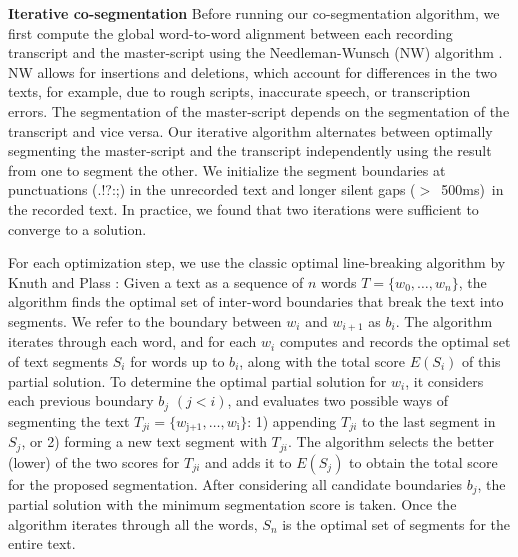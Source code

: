 \textbf{Iterative co-segmentation}
Before running our co-segmentation algorithm, we first compute the global word-to-word alignment between each recording transcript and the master-script using the Needleman-Wunsch (NW) algorithm \cite{needleman1970general}. NW allows for insertions and deletions, which account for differences in the two texts, for example, due to rough scripts, inaccurate speech, or transcription errors.
%
The segmentation of the master-script depends on the segmentation of the transcript and vice versa. Our iterative algorithm alternates between optimally segmenting the master-script and the transcript independently using the result from one to segment the other. We initialize the segment boundaries at punctuations (.!?:;) in the unrecorded text and longer silent gaps ($>$\ 500ms)\ in the recorded text. In practice, we
found that two iterations were sufficient to converge to a solution.


For each optimization step, we use the classic optimal line-breaking algorithm by Knuth and Plass \cite{knuth1981breaking}: Given a text as a sequence of $n$ words $T = \{w_0,\dots,w_n\}$, the algorithm finds the optimal set of inter-word
boundaries that break the text into segments. We refer to the boundary between $w_i$ and $w_{i+1}$ as
$b_i$.
%
The algorithm iterates through each word, and for each $w_i$
computes and records the optimal set of text segments $S_i$ for words up to $b_i$, along with the total score $E(S_i)$ of
this partial solution. To determine the optimal partial solution for $w_i$, it
considers each previous boundary $b_j$ $(j<i)$, and evaluates two possible ways of
segmenting the text $T_{ji} = \{w_\text{j+1},
\dots,w_\text{i}\}$: 1) appending $T_{ji}$ to the last segment in $S_j$, or 2) forming a new text segment with $T_{ji}$. The algorithm selects the better (lower) of the two scores for $T_{ji}$ and adds it
to $E(S_j)$ to obtain the total score for the proposed
segmentation. After considering all candidate boundaries $b_j$, the partial solution with the minimum segmentation score is taken. Once the algorithm iterates through all the words, $S_n$ is the
optimal set of segments for the entire text. 

